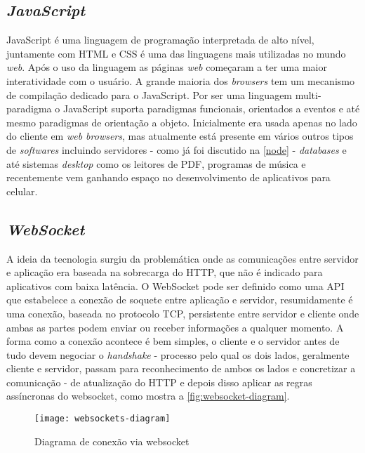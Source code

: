 \subsection[\textit{JavaScript}]{\textit{JavaScript}}\label{js}
JavaScript é uma linguagem de programação interpretada de alto nível, juntamente com HTML e CSS é uma das linguagens mais utilizadas no mundo \textit{web}.
Após o uso da linguagem as páginas \textit{web} começaram a ter uma maior interatividade com o usuário. A grande maioria dos \textit{browsers} tem um
mecanismo de compilação dedicado para o JavaScript. Por ser uma linguagem multi-paradigma o JavaScript suporta paradigmas funcionais, orientados a eventos 
e até mesmo paradigmas de orientação a objeto.
Inicialmente era usada apenas no lado do cliente em \textit{web browsers}, mas atualmente está presente em vários outros tipos de \textit{softwares} incluindo
servidores - como já foi discutido na \autoref{node} - \textit{databases} e até sistemas \textit{desktop} como os leitores de PDF, programas de música e recentemente
vem ganhando espaço no desenvolvimento de aplicativos para celular.

\subsection[\textit{WebSocket}]{\textit{WebSocket}}\label{websocket}
A ideia da tecnologia surgiu da problemática onde as comunicações entre servidor e aplicação era baseada na sobrecarga do HTTP, que não é indicado para aplicativos
com baixa latência. O WebSocket pode ser definido como uma API que estabelece a conexão de soquete entre aplicação e servidor, resumidamente é uma conexão, baseada no protocolo TCP, persistente
entre servidor e cliente onde ambas as partes podem enviar ou receber informações a qualquer momento. A forma como a conexão acontece é bem simples,
o cliente e o servidor antes de tudo devem negociar o \textit{handshake} - processo pelo qual os dois lados, geralmente cliente e servidor, passam para
reconhecimento de ambos os lados e concretizar a comunicação - de atualização do HTTP e depois disso aplicar as regras assíncronas do websocket, como mostra
a \autoref{fig:websocket-diagram}.

\begin{figure}[h!]
	\texttt{[image: websockets-diagram]}
	\centering
	\caption[Diagrama de conexão via websocket]{Diagrama de conexão via websocket}
	\label{fig:websocket-diagram}
\end{figure}
\FloatBarrier


